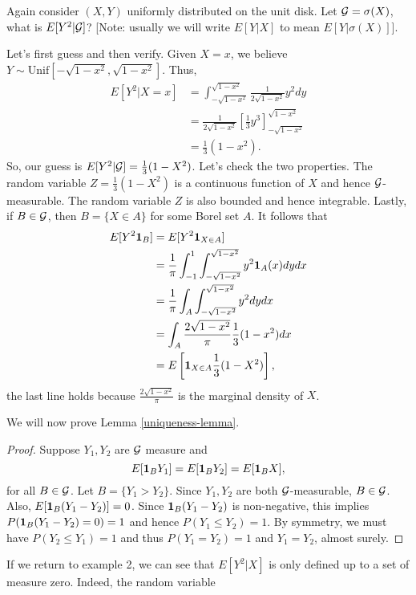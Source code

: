 \begin{example}
    Again consider $(X,Y)$ uniformly distributed on the unit disk. Let ${\mathcal{G}} = \sigma(X)$, what is $E[Y^2|{\mathcal{G}}]$? [Note: usually we will write $E[Y|X]$ to mean $E[Y|\sigma(X)]$]. 

    Let's first guess and then verify. Given $X=x$, we believe $Y\sim \text{Unif}[-\sqrt{1-x^2},\sqrt{1-x^2}]$. Thus,
    \begin{align*}
        E[Y^2|X=x] &=\int_{-\sqrt{1-x^2}}^{\sqrt{1-x^2}} \frac{1}{2\sqrt{1-x^2}}y^2 dy\\
        &= \frac{1}{2\sqrt{1-x^2}}\left[\frac{1}{3}y^3\right]_{-\sqrt{1-x^2}}^{\sqrt{1-x^2}}\\
        &=\frac{1}{3}(1-x^2).
    \end{align*}
    So, our guess is $E[Y^2|{\mathcal{G}}]=\frac{1}{3}(1-X^2)$. Let's check the two properties. The random variable $Z=\frac{1}{3}(1-X^2)$ is a continuous function of $X$ and hence ${\mathcal{G}}$-measurable. The random variable $Z$ is also bounded and hence integrable. Lastly, if $B \in {\mathcal{G}}$, then $B=\{X\in A\}$ for some Borel set $A$. It follows that
    \begin{align*}
        E[ Y^2{{\bf 1}}_B]&= E[Y^2{{\bf 1}}_{X \in A}]\\
        &=\frac{1}{\pi}\int_{-1}^1 \int_{-\sqrt{1-x^2}}^{\sqrt{1-x^2}} y^2{{\bf 1}}_{A}(x) dydx\\
        &=\frac{1}{\pi}\int_A \int_{-\sqrt{1-x^2}}^{\sqrt{1-x^2}}y^2dydx\\
        &=\int_A \frac{2\sqrt{1-x^2}}{\pi} \frac{1}{3}(1-x^2)dx\\
        &=E\left[{{\bf 1}}_{X \in A}\frac{1}{3}(1-X^2)\right], 
    \end{align*}
    the last line holds because $\frac{2\sqrt{1-x^2}}{\pi}$ is the marginal density of $X$.
\end{example}
We will now prove Lemma \ref{uniqueness-lemma}.
\begin{proof}
    Suppose $Y_1,Y_2$ are ${\mathcal{G}}$ measure and 
    \[E[{{\bf 1}}_B Y_1]=E[{{\bf 1}}_B Y_2] = E[{{\bf 1}}_B X], \]
    for all $B \in {\mathcal{G}}$. Let $B = \{Y_1 > Y_2\}$. Since $Y_1,Y_2$ are both ${\mathcal{G}}$-measurable, $B \in {\mathcal{G}}$. Also, $E[{{\bf 1}}_B(Y_1-Y_2)]=0$. Since ${{\bf 1}}_B(Y_1-Y_2)$ is non-negative, this implies $P({{\bf 1}}_B(Y_1-Y_2)=0)=1$ and hence $P(Y_1 \le Y_2)=1$. By symmetry, we must have $P(Y_2 \le Y_1)=1$ and thus $P(Y_1=Y_2)=1$ and $Y_1=Y_2$, almost surely.
\end{proof}
If we return to example 2, we can see that $E[Y^2|X]$ is only defined up to a set of measure zero. Indeed, the random variable 
